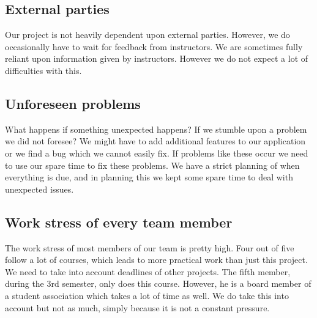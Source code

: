 \documentclass[a4paper]{article}
\begin{document}
\subsection{External parties}
Our project is not heavily dependent upon external parties. However, we do occasionally have to wait for feedback from instructors. We are sometimes fully reliant upon information given by instructors. However we do not expect a lot of difficulties with this.

\subsection{Unforeseen problems}
What happens if something unexpected happens? If we stumble upon a problem we did not foresee? We might have to add additional features to our application or we find a bug which we cannot easily fix. If problems like these occur we need to use our spare time to fix these problems. We have a strict planning of when everything is due, and in planning this we kept some spare time to deal with unexpected issues.

\subsection{Work stress of every team member}
The work stress of most members of our team is pretty high. Four out of five follow a lot of courses, which leads to more practical work than just this project. We need to take into account deadlines of other projects. The fifth member, during the 3rd semester, only does this course. However, he is a board member of a student association which takes a lot of time as well. We do take this into account but not as much, simply because it is not a constant pressure.
\end{document}
